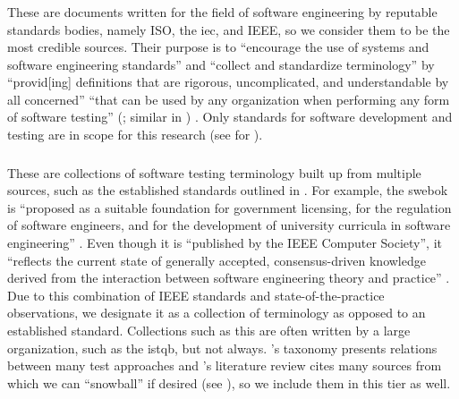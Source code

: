 \ifnotpaper\newpage\fi
\subsubsection{}\label{stds}

These are documents written for the field of software engineering by reputable
standards bodies, namely ISO, the \acf{iec}, and IEEE, so we consider them to
be the most credible sources. Their purpose is to
``encourage the use of systems and software engineering standards'' and
``collect and standardize terminology'' by ``provid[ing] definitions that are
rigorous, uncomplicated, and understandable by all concerned''
\citep[p.~viii]{IEEE2017} ``that can be used by any organization when
performing any form of software testing'' \ifnotpaper
    (\citeyear[p.~vii]{IEEE2022}; similar in \citeyear[p.~ix]{IEEE2016})\else
    \cite[p.~vii]{IEEE2022}\fi.
Only standards for software development and testing are in scope for
this research (see  for \highLvlScope).

\subsubsection{}\label{metas}

These are collections of software testing terminology built up from multiple
sources, such as the established standards outlined in . For
example, the \acs{swebok} is ``proposed as a
suitable foundation for government licensing, for the regulation of software
engineers, and for the development of university curricula in software
engineering'' \citep[p.~xix]{KanerEtAl2011}. Even though it is ``published by
the IEEE Computer Society'', it ``reflects the current state of generally
accepted, consensus-driven knowledge derived from the interaction between
software engineering theory and practice'' \citep{AboutSWEBOK}. Due to this
combination of IEEE standards and state-of-the-practice observations, we
designate it as a collection of terminology as opposed to an established
standard. Collections such as this are often written by a large
organization, such as the \acf{istqb}, but not always. \ifnotpaper \else
    \citeauthor{Firesmith2015} \fi \citet{Firesmith2015}'s taxonomy presents
relations between many test approaches and \ifnotpaper \else
    \citeauthor{DoğanEtAl2014} \fi \citet{DoğanEtAl2014}'s literature
review cites many sources from which we can ``snowball'' if desired
(see ), so we include them in this tier as well.

